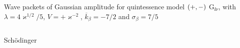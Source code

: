 \documentclass[9pt]{beamer}
\begin{document}
\begin{frame}%
{Wave packets of Gaussian amplitude for quintessence model ${\left(+,-\right)}$}%
{$\mathrm{G}_{\ii\nu}$, with $\lambda = 4\varkappa^{1/2}/5$,
$V = +\varkappa^{-2}$, $\overline{k}_\beta = -7/2$ and $\sigma_\beta = 7/5$}
\begin{columns}
\begin{column}{.49\textwidth}
\begin{block}{Schödinger}

\end{block}
\end{column}
\end{columns}
\end{frame}
\end{document}

